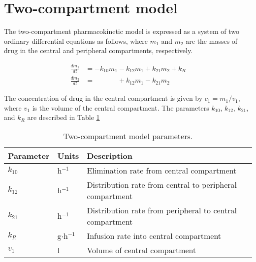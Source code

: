 \documentclass{article}
\begin{document}
\section{Two-compartment model}
The two-compartment pharmacokinetic model is expressed as a system of two ordinary differential equations as follows, where $m_1$ and $m_2$ are the masses of drug in the central and peripheral compartments, respectively.

\begin{align}
\frac{dm_1}{dt} &= -k_{10}m_1 - k_{12}m_1 + k_{21}m_2 + k_R \nonumber \\
\frac{dm_2}{dt} &= \phantom{-k_{10}m_1} + k_{12}m_1 - k_{21}m_2 \nonumber
\end{align}

The concentration of drug in the central compartment is given by $c_1 = m_1/v_1$, where $v_1$ is the volume of the central compartment. The parameters $k_{10}$, $k_{12}$, $k_{21}$, and $k_R$ are described in Table \ref{tab:pkpars}

\begin{table}
\begin{tabular}{lll} \hline
Parameter & Units & Description \\ \hline
$k_{10}$ & h$^{-1}$ & Elimination rate from central compartment\\
$k_{12}$ & h$^{-1}$ & Distribution rate from central to peripheral compartment\\
$k_{21}$ & h$^{-1}$ & Distribution rate from peripheral to central compartment\\
$k_R$  & g$\cdot$h$^{-1}$ & Infusion rate into central compartment\\
$v_1$  & l & Volume of central compartment\\
\hline
\end{tabular}
\caption{Two-compartment model parameters. \label{tab:pkpars}}
\end{table}
\end{document}
